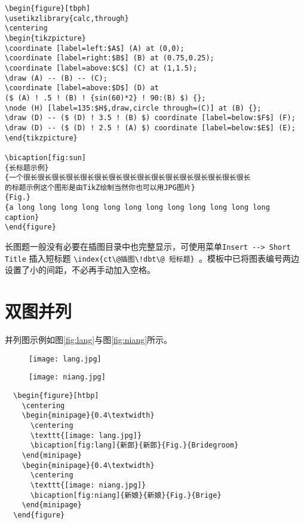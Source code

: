\begin{lstlisting}
\begin{figure}[tbph]
\usetikzlibrary{calc,through}
\centering
\begin{tikzpicture}
\coordinate [label=left:$A$] (A) at (0,0);
\coordinate [label=right:$B$] (B) at (0.75,0.25);
\coordinate [label=above:$C$] (C) at (1,1.5);
\draw (A) -- (B) -- (C);
\coordinate [label=above:$D$] (D) at
($ (A) ! .5 ! (B) ! {sin(60)*2} ! 90:(B) $) {};
\node (H) [label=135:$H$,draw,circle through=(C)] at (B) {};
\draw (D) -- ($ (D) ! 3.5 ! (B) $) coordinate [label=below:$F$] (F);
\draw (D) -- ($ (D) ! 2.5 ! (A) $) coordinate [label=below:$E$] (E);
\end{tikzpicture}

\bicaption[fig:sun]
{长标题示例}
{一个很长很长很长很长很长很长很长很长很长很长很长很长很长很长很长很长
的标题示例这个图形是由TikZ绘制当然你也可以用JPG图片}
{Fig.}
{a long long long long long long long long long long long long caption}
\end{figure}
\end{lstlisting}

长图题一般没有必要在插图目录中也完整显示，可使用菜单\texttt{Insert -{}-\textgreater{} Short
Title} 插入短标题 \verb|\index{ct\@插图\!dbt\@ 短标题} |。模板中已将图表编号两边设置了小的间距，不必再手动加入空格。


\section{双图并列}

并列图示例如图\ref{fig:lang}与图\ref{fig:niang}所示。

\begin{figure}[htbp]
  \centering
  \begin{minipage}{0.4\textwidth}
    \centering
    \texttt{[image: lang.jpg]}
  \end{minipage}
  \begin{minipage}{0.4\textwidth}
    \centering
    \texttt{[image: niang.jpg]}
  \end{minipage}
\end{figure}

\begin{lstlisting}
  \begin{figure}[htbp]
    \centering
    \begin{minipage}{0.4\textwidth}
      \centering
      \texttt{[image: lang.jpg]}
      \bicaption[fig:lang]{新郎}{新郎}{Fig.}{Bridegroom}
    \end{minipage}
    \begin{minipage}{0.4\textwidth}
      \centering
      \texttt{[image: niang.jpg]}
      \bicaption[fig:niang]{新娘}{新娘}{Fig.}{Brige}
    \end{minipage}
  \end{figure}
\end{lstlisting}

